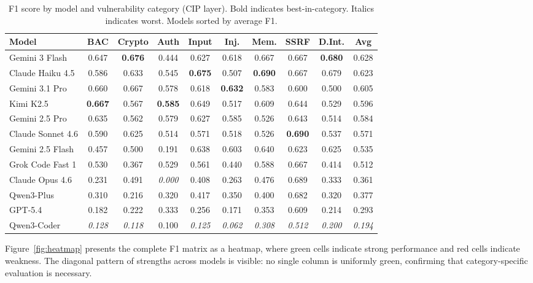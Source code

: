\documentclass[10pt,twocolumn]{article}
\begin{document}
\begin{table}[!htbp]
\centering
\caption{F1 score by model and vulnerability category (CIP layer). Bold indicates best-in-category. Italics indicates worst. Models sorted by average F1.}
\label{tab:full_category_f1}
\footnotesize
\begin{tabular}{@{}l c c c c c c c c c@{}}
\toprule
\textbf{Model} & \textbf{BAC} & \textbf{Crypto} & \textbf{Auth} & \textbf{Input} & \textbf{Inj.} & \textbf{Mem.} & \textbf{SSRF} & \textbf{D.Int.} & \textbf{Avg} \\
\midrule
Gemini 3 Flash     & 0.647 & \textbf{0.676} & 0.444 & 0.627 & 0.618 & 0.667 & 0.667 & \textbf{0.680} & 0.628 \\
Claude Haiku 4.5   & 0.586 & 0.633 & 0.545 & \textbf{0.675} & 0.507 & \textbf{0.690} & 0.667 & 0.679 & 0.623 \\
Gemini 3.1 Pro     & 0.660 & 0.667 & 0.578 & 0.618 & \textbf{0.632} & 0.583 & 0.600 & 0.500 & 0.605 \\
Kimi K2.5          & \textbf{0.667} & 0.567 & \textbf{0.585} & 0.649 & 0.517 & 0.609 & 0.644 & 0.529 & 0.596 \\
Gemini 2.5 Pro     & 0.635 & 0.562 & 0.579 & 0.627 & 0.585 & 0.526 & 0.643 & 0.514 & 0.584 \\
Claude Sonnet 4.6  & 0.590 & 0.625 & 0.514 & 0.571 & 0.518 & 0.526 & \textbf{0.690} & 0.537 & 0.571 \\
Gemini 2.5 Flash   & 0.457 & 0.500 & 0.191 & 0.638 & 0.603 & 0.640 & 0.623 & 0.625 & 0.535 \\
Grok Code Fast 1   & 0.530 & 0.367 & 0.529 & 0.561 & 0.440 & 0.588 & 0.667 & 0.414 & 0.512 \\
Claude Opus 4.6    & 0.231 & 0.491 & \textit{0.000} & 0.408 & 0.263 & 0.476 & 0.689 & 0.333 & 0.361 \\
Qwen3-Plus         & 0.310 & 0.216 & 0.320 & 0.417 & 0.350 & 0.400 & 0.682 & 0.320 & 0.377 \\
GPT-5.4            & 0.182 & 0.222 & 0.333 & 0.256 & 0.171 & 0.353 & 0.609 & 0.214 & 0.293 \\
Qwen3-Coder        & \textit{0.128} & \textit{0.118} & 0.100 & \textit{0.125} & \textit{0.062} & \textit{0.308} & \textit{0.512} & \textit{0.200} & \textit{0.194} \\
\bottomrule
\end{tabular}
\end{table}

Figure~\ref{fig:heatmap} presents the complete F1 matrix as a heatmap, where green cells indicate strong performance and red cells indicate weakness. The diagonal pattern of strengths across models is visible: no single column is uniformly green, confirming that category-specific evaluation is necessary.
\end{document}
